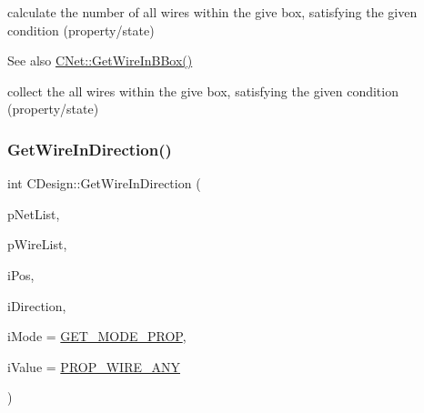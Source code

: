 calculate the number of all wires within the give box, satisfying the given condition (property/state) 

\begin{DoxySeeAlso}{See also}
\mbox{\hyperlink{classCNet_a885207dedf1b08d52638bda17ba12227}{C\+Net\+::\+Get\+Wire\+In\+B\+Box()}} 
\end{DoxySeeAlso}
collect the all wires within the give box, satisfying the given condition (property/state) \mbox{\label{classCDesign_a0b7936130fc4fb79009bfaf1df97e76e}} 
\subsubsection{\texorpdfstring{GetWireInDirection()}{GetWireInDirection()}\hspace{0.1cm}{\footnotesize\ttfamily [1/2]}}
{\footnotesize\ttfamily int C\+Design\+::\+Get\+Wire\+In\+Direction (\begin{DoxyParamCaption}\item[{vector$<$ \mbox{\hyperlink{classCNet}{C\+Net}} $\ast$ $>$ $\ast$}]{p\+Net\+List,  }\item[{vector$<$ \mbox{\hyperlink{classCWire}{C\+Wire}} $\ast$ $>$ $\ast$}]{p\+Wire\+List,  }\item[{int}]{i\+Pos,  }\item[{int}]{i\+Direction,  }\item[{int}]{i\+Mode = {\ttfamily \mbox{\hyperlink{BoxRouter_8h_a678c4c2628bee05b15999bb00ded44d3}{G\+E\+T\+\_\+\+M\+O\+D\+E\+\_\+\+P\+R\+OP}}},  }\item[{int}]{i\+Value = {\ttfamily \mbox{\hyperlink{BoxRouter_8h_a3190814b5494277cd30ff3d03c8d4058}{P\+R\+O\+P\+\_\+\+W\+I\+R\+E\+\_\+\+A\+NY}}} }\end{DoxyParamCaption})}

\mbox{\label{classCDesign_a569c1b0aa4defe50ebb89a5a4054631c}} 
